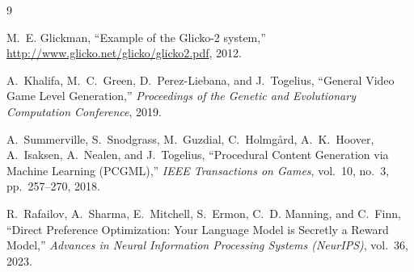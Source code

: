 \documentclass[11pt,a4paper]{article}
\theoremstyle{plain}
\theoremstyle{definition}
\theoremstyle{remark}
\begin{document}
\begin{thebibliography}{9}

M.~E. Glickman, ``Example of the Glicko-2 system,'' 
\url{http://www.glicko.net/glicko/glicko2.pdf}, 2012.

A.~Khalifa, M.~C.~Green, D.~Perez-Liebana, and J.~Togelius, ``General Video Game Level Generation,''
\emph{Proceedings of the Genetic and Evolutionary Computation Conference}, 2019.

A.~Summerville, S.~Snodgrass, M.~Guzdial, C.~Holmg{\aa}rd, A.~K.~Hoover, A.~Isaksen, A.~Nealen, and J.~Togelius, ``Procedural Content Generation via Machine Learning (PCGML),''
\emph{IEEE Transactions on Games}, vol.~10, no.~3, pp.~257--270, 2018.

R.~Rafailov, A.~Sharma, E.~Mitchell, S.~Ermon, C.~D. Manning, and C.~Finn, ``Direct Preference Optimization: Your Language Model is Secretly a Reward Model,''
\emph{Advances in Neural Information Processing Systems (NeurIPS)}, vol.~36, 2023.

\end{thebibliography}
\end{document}
